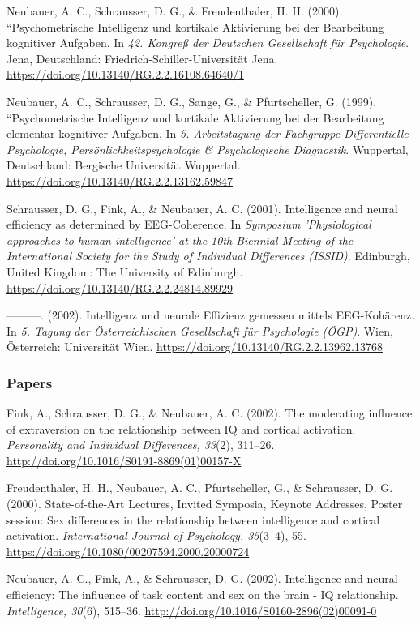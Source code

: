 \documentclass[
]{article}
\begin{document}
Neubauer, A. C., Schrausser, D. G., \& Freudenthaler, H. H. (2000).
``Psychometrische Intelligenz und kortikale Aktivierung bei der
Bearbeitung kognitiver Aufgaben. In \emph{42. Kongreß der Deutschen
Gesellschaft für Psychologie}. Jena, Deutschland:
Friedrich-Schiller-Universität Jena.
\url{https://doi.org/10.13140/RG.2.2.16108.64640/1}

Neubauer, A. C., Schrausser, D. G., Sange, G., \& Pfurtscheller, G.
(1999). ``Psychometrische Intelligenz und kortikale Aktivierung bei der
Bearbeitung elementar-kognitiver Aufgaben. In \emph{5. Arbeitstagung der
Fachgruppe Differentielle Psychologie, Persönlichkeitspsychologie \&
Psychologische Diagnostik}. Wuppertal, Deutschland: Bergische
Universität Wuppertal. \url{https://doi.org/10.13140/RG.2.2.13162.59847}

Schrausser, D. G., Fink, A., \& Neubauer, A. C. (2001). Intelligence and
neural efficiency as determined by EEG-Coherence. In \emph{Symposium
'Physiological approaches to human intelligence' at the 10th Biennial
Meeting of the International Society for the Study of Individual
Differences (ISSID)}. Edinburgh, United Kingdom: The University of
Edinburgh. \url{https://doi.org/10.13140/RG.2.2.24814.89929}

---------. (2002). Intelligenz und neurale Effizienz gemessen mittels
EEG-Kohärenz. In \emph{5. Tagung der Österreichischen Gesellschaft für
Psychologie (ÖGP)}. Wien, Österreich: Universität Wien.
\url{https://doi.org/10.13140/RG.2.2.13962.13768}

\hypertarget{papers-2}{%
\subsubsection{Papers}\label{papers-2}}

Fink, A., Schrausser, D. G., \& Neubauer, A. C. (2002). The moderating
influence of extraversion on the relationship between IQ and cortical
activation. \emph{Personality and Individual Differences, 33}(2),
311--26. \url{http://doi.org/10.1016/S0191-8869(01)00157-X}

Freudenthaler, H. H., Neubauer, A. C., Pfurtscheller, G., \& Schrausser,
D. G. (2000). State-of-the-Art Lectures, Invited Symposia, Keynote
Addresses, Poster session: Sex differences in the relationship between
intelligence and cortical activation. \emph{International Journal of
Psychology, 35}(3--4), 55.
\url{https://doi.org/10.1080/00207594.2000.20000724}

Neubauer, A. C., Fink, A., \& Schrausser, D. G. (2002). Intelligence and
neural efficiency: The influence of task content and sex on the brain -
IQ relationship. \emph{Intelligence, 30}(6), 515--36.
\url{http://doi.org/10.1016/S0160-2896(02)00091-0}
\end{document}
